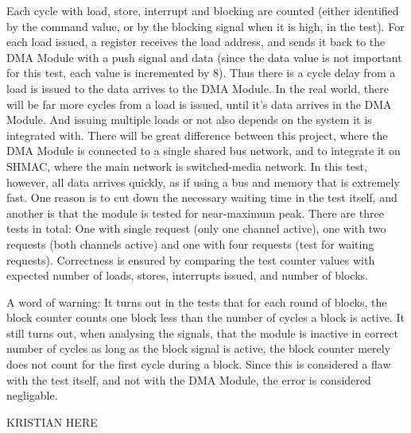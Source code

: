 \begin{itemize}
    Each cycle with load, store, interrupt and blocking are counted (either identified by the command value, or by the blocking signal when it is high, in the test).
    For each load issued, a register receives the load address, and sends it back to the DMA Module with a push signal and data (since the data value is not important for this test, each value is incremented by 8).
    Thus there is a cycle delay from a load is issued to the data arrives to the DMA Module.
    In the real world, there will be far more cycles from a load is issued, until it's data arrives in the DMA Module.
    And issuing multiple loads or not also depends on the system it is integrated with.
    There will be great difference between this project, where the DMA Module is connected to a single shared bus network, and to integrate it on SHMAC, where the main network is switched-media network.
    In this test, however, all data arrives quickly, as if using a bus and memory that is extremely fast.
    One reason is to cut down the necessary waiting time in the test itself, and another is that the module is tested for near-maximum peak.
    There are three tests in total: One with single request (only one channel active), one with two requests (both channels active) and one with four requests (test for waiting requests).
    Correctness is ensured by comparing the test counter values with expected number of loads, stores, interrupts issued, and number of blocks.
    
    A word of warning: It turns out in the tests that for each round of blocks, the block counter counts one block less than the number of cycles a block is active. It still turns out, when analysing the signals, that the module is inactive in correct number of cycles as long as the block signal is active, the block counter merely does not count for the first cycle during a block. Since this is considered a flaw with the test itself, and not with the DMA Module, the error is considered negligable. 
\end{itemize}

KRISTIAN HERE
